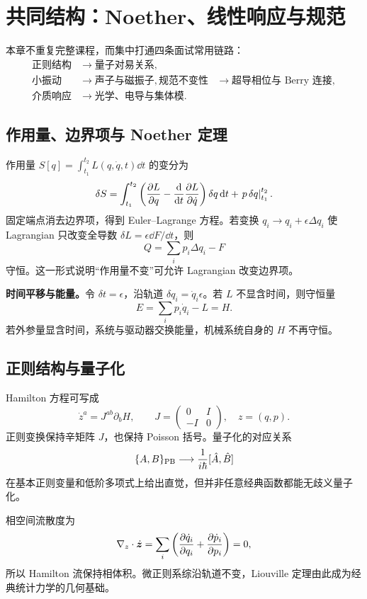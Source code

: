 \chapter{共同结构：Noether、线性响应与规范}

\begin{mapbox}
本章不重复完整课程，而集中打通四条面试常用链路：
\[
\begin{aligned}
\text{正则结构}&\to\text{量子对易关系},\\
\text{小振动}&\to\text{声子与磁振子},
\text{规范不变性}&\to\text{超导相位与 Berry 连接},\\
\text{介质响应}&\to\text{光学、电导与集体模}.
\end{aligned}
\]
\end{mapbox}

\section{作用量、边界项与 Noether 定理}
作用量
$S[q]=\int_{t_1}^{t_2}L(q,\dot q,t)\dd t$ 的变分为
\[
\delta S=\int_{t_1}^{t_2}
\left(\frac{\partial L}{\partial q}-\frac{\mathrm d }{\mathrm d t}\frac{\partial L}{\partial \dot q}\right)\delta q\,\mathrm d t
+\left.p\,\delta q\right|_{t_1}^{t_2}.
\]
固定端点消去边界项，得到 Euler--Lagrange 方程。若变换
$q_i\to q_i+\epsilon\Delta q_i$ 使 Lagrangian 只改变全导数
$\delta L=\epsilon\dd F/\dd t$，则
\[
\boxed{Q=\sum_i p_i\Delta q_i-F}
\]
守恒。这一形式说明“作用量不变”可允许 Lagrangian 改变边界项。

\begin{examplebox}
\textbf{时间平移与能量。}令 $\delta t=\epsilon$，沿轨道
$\delta q_i=\dot q_i\epsilon$。若 $L$ 不显含时间，则守恒量
\[
E=\sum_i p_i\dot q_i-L=H.
\]
若外参量显含时间，系统与驱动器交换能量，机械系统自身的 $H$ 不再守恒。
\end{examplebox}

\section{正则结构与量子化}
Hamilton 方程可写成
\[
\dot z^a=J^{ab}\partial_bH,\qquad
J=\begin{pmatrix}0&I\\-I&0\end{pmatrix},
\quad z=(q,p).
\]
正则变换保持辛矩阵 $J$，也保持 Poisson 括号。量子化的对应关系
\[
\{A,B\}_{\rm PB}\longrightarrow\frac1{i\hbar}[\hat A,\hat B]
\]
在基本正则变量和低阶多项式上给出直觉，但并非任意经典函数都能无歧义量子化。

相空间流散度为
\[
\nabla_z\cdot\dot{\bm{z}}
=\sum_i\left(\frac{\partial \dot q_i}{\partial q_i}+
\frac{\partial \dot p_i}{\partial p_i}\right)=0,
\]
所以 Hamilton 流保持相体积。微正则系综沿轨道不变，Liouville 定理由此成为经典统计力学的几何基础。

